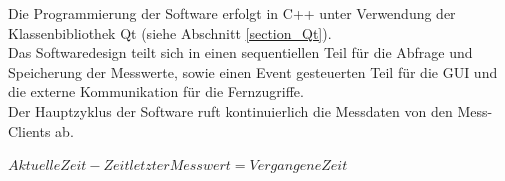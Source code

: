 Die Programmierung der Software erfolgt in C++ unter Verwendung der Klassenbibliothek Qt (siehe Abschnitt \ref{section_Qt}).\\
Das Softwaredesign teilt sich in einen sequentiellen Teil für die Abfrage und Speicherung der Messwerte, sowie einen Event gesteuerten Teil für die \ac{GUI} und die externe Kommunikation für die Fernzugriffe.\\

Der Hauptzyklus der Software ruft kontinuierlich die Messdaten von den Mess-Clients ab.

$Aktuelle Zeit - Zeit letzter Messwert = Vergangene Zeit$


